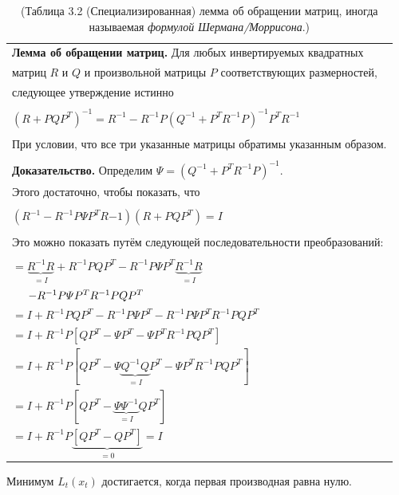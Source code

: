 \documentclass[10pt,a4paper]{article}
\begin{document}
\begin{table}[H]
\begin{center}
\begin{tabular}{|l|}
\hline
\textbf{Лемма об обращении матриц.} Для любых инвертируемых квадратных\\ матриц $R$ и $Q$ и произвольной матрицы $P$ соответствующих размерностей,\\ следующее утверждение истинно\\
{}\\
$(R+P Q P^T)^{-1}=R^{-1}-R^{-1}P(Q^{-1}+P^T R^{-1}P)^{-1}P^T R^{-1}$\\
{}\\
При условии, что все три указанные матрицы обратимы указанным образом.\\
{}\\
\textbf{Доказательство.} Определим $\varPsi=(Q^{-1}+P^T R^{-1}P)^{-1}$.\\
Этого достаточно, чтобы показать, что\\
{}\\
$(R^{-1}-R^{-1}P \varPsi P^T R{-1})(R+P Q P^T)=I$\\
{}\\
Это можно показать путём следующей последовательности преобразований:\\
{}\\
$=\underbrace{R^{-1}R}_{=I}+R^{-1}P Q P^T-R^{-1}P\varPsi P^T\underbrace{R^{-1}R}_{=I}$\\
$\hspace{5mm}-R^{-1}P\varPsi P^T R^{-1}P Q P^T$\\
$=I+R^{-1}P Q P^T-R^{-1}P\varPsi P^T-R^{-1}P\varPsi P^T R^{-1}P Q P^T$\\
$=I+R^{-1}P [Q P^T-\varPsi P^T-\varPsi P^T R^{-1}P Q P^T] $\\
$=I+R^{-1}P [ Q P^T-\varPsi \underbrace{Q^{-1}Q}_{=I} P^T-\varPsi P^T  R^{-1}P Q P^T] $\\
$=I+R^{-1}P [ Q P^T-\underbrace{\varPsi\varPsi^{-1}}_{=I}Q P^T]$\\
$=I+R^{-1}P\underbrace{[Q P^T-Q P^T]}_{=0}=I$\\

\hline
\end{tabular}
\caption{(Таблица 3.2 (Специализированная) лемма об обращении матриц, иногда называемая \textit{формулой Шермана/Моррисона}.)}
\end{center}
\end{table}

Минимум $L_t(x_t)$ достигается, когда первая производная равна нулю.\\
\end{document}
